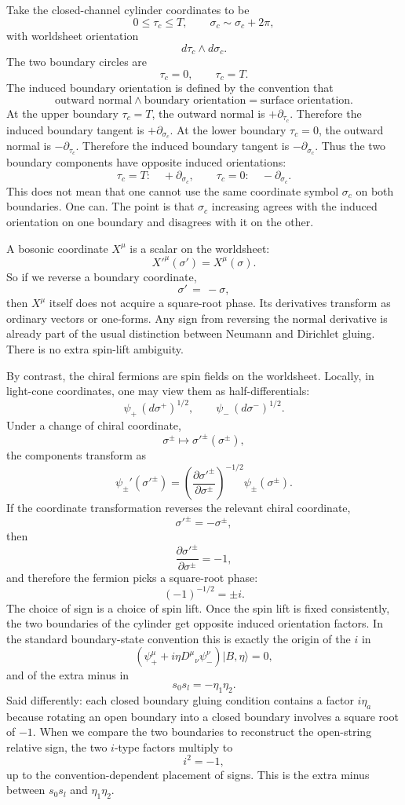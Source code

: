 \documentclass[
  10pt,
  a4paper,
  openany]{book}
\begin{document}
Take the closed-channel cylinder coordinates to be \[
0\leq \tau_c\leq T,
\qquad
\sigma_c\sim\sigma_c+2\pi,
\] with worldsheet orientation \[
d\tau_c\wedge d\sigma_c.
\] The two boundary circles are \[
\tau_c=0,
\qquad
\tau_c=T.
\] The induced boundary orientation is defined by the convention that \[
\text{outward normal}\wedge\text{boundary orientation}
=
\text{surface orientation}.
\] At the upper boundary \(\tau_c=T\), the outward normal is
\(+\partial_{\tau_c}\). Therefore the induced boundary tangent is
\(+\partial_{\sigma_c}\). At the lower boundary \(\tau_c=0\), the
outward normal is \(-\partial_{\tau_c}\). Therefore the induced boundary
tangent is \(-\partial_{\sigma_c}\). Thus the two boundary components
have opposite induced orientations: \[
\tau_c=T:\quad +\partial_{\sigma_c},
\qquad
\tau_c=0:\quad -\partial_{\sigma_c}.
\] This does not mean that one cannot use the same coordinate symbol
\(\sigma_c\) on both boundaries. One can. The point is that \(\sigma_c\)
increasing agrees with the induced orientation on one boundary and
disagrees with it on the other.

A bosonic coordinate \(X^\mu\) is a scalar on the worldsheet: \[
X'^\mu(\sigma')=X^\mu(\sigma).
\] So if we reverse a boundary coordinate, \[
\sigma'\,=\,-\sigma,
\] then \(X^\mu\) itself does not acquire a square-root phase. Its
derivatives transform as ordinary vectors or one-forms. Any sign from
reversing the normal derivative is already part of the usual distinction
between Neumann and Dirichlet gluing. There is no extra spin-lift
ambiguity.

By contrast, the chiral fermions are spin fields on the worldsheet.
Locally, in light-cone coordinates, one may view them as
half-differentials: \[
\psi_+\, (d\sigma^+)^{1/2},
\qquad
\psi_-\, (d\sigma^-)^{1/2}.
\] Under a change of chiral coordinate, \[
\sigma^\pm\mapsto\sigma'^\pm(\sigma^\pm),
\] the components transform as \[
\psi_\pm'(\sigma'^\pm)
=
\left(
\frac{\partial\sigma'^\pm}{\partial\sigma^\pm}
\right)^{-1/2}
\psi_\pm(\sigma^\pm).
\] If the coordinate transformation reverses the relevant chiral
coordinate, \[
\sigma'^\pm=-\sigma^\pm,
\] then \[
\frac{\partial\sigma'^\pm}{\partial\sigma^\pm}=-1,
\] and therefore the fermion picks a square-root phase: \[
\left(-1\right)^{-1/2}=\pm i.
\] The choice of sign is a choice of spin lift. Once the spin lift is
fixed consistently, the two boundaries of the cylinder get opposite
induced orientation factors. In the standard boundary-state convention
this is exactly the origin of the \(i\) in \[
\left(\psi_+^\mu+i\eta D^\mu{}_\nu\psi_-^\nu\right)|B,\eta\rangle=0,
\] and of the extra minus in \[
s_0s_l=-\eta_1\eta_2.
\] Said differently: each closed boundary gluing condition contains a
factor \(i\eta_a\) because rotating an open boundary into a closed
boundary involves a square root of \(-1\). When we compare the two
boundaries to reconstruct the open-string relative sign, the two
\(i\)-type factors multiply to \[
i^2=-1,
\] up to the convention-dependent placement of signs. This is the extra
minus between \(s_0s_l\) and \(\eta_1\eta_2\).
\end{document}
